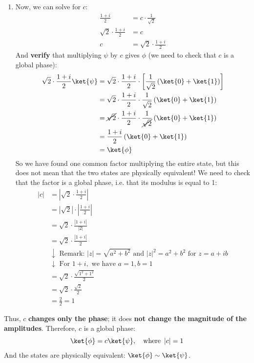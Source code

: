 \begin{enumerate}
    \item Now, we can solve for $c$:
    \begin{equation*}
        \begin{aligned}
            \frac{1+i}{2} &= c \cdot \frac{1}{\sqrt{2}} \\
            \sqrt{2} \cdot \frac{1+i}{2} &= c \\
            c &= \sqrt{2} \cdot \frac{1+i}{2}
        \end{aligned}
    \end{equation*}
    And \textbf{verify} that multiplying $\psi$ by $c$ gives $\phi$ (we need to check that $c$ is a global phase):
    \begin{align*}
        \sqrt{2} \cdot \frac{1+i}{2} \ket{\psi} &= \sqrt{2} \cdot \frac{1+i}{2} \cdot \left[\frac{1}{\sqrt{2}}\left(\ket{0} + \ket{1}\right)\right] \\
        &= \sqrt{2} \cdot \frac{1+i}{2} \cdot \frac{1}{\sqrt{2}} \left(\ket{0} + \ket{1}\right) \\
        &= \cancel{\sqrt{2}} \cdot \frac{1+i}{2} \cdot \frac{1}{\cancel{\sqrt{2}}} \left(\ket{0} + \ket{1}\right) \\
        &= \frac{1+i}{2} \left(\ket{0} + \ket{1}\right) \\
        &= \ket{\phi}
    \end{align*}
    So we have found one common factor multiplying the entire state, but this does not mean that the two states are physically equivalent! We need to check that the factor is a global phase, i.e. that its modulus is equal to 1:
    \begin{align*}
        \left|c\right| &= \left|\sqrt{2} \cdot \frac{1+i}{2}\right| \\
        &= \left|\sqrt{2}\right| \cdot \left|\frac{1+i}{2}\right| \\
        &= \sqrt{2} \cdot \frac{\left|1+i\right|}{\left|2\right|} \\
        &= \sqrt{2} \cdot \frac{\left|1+i\right|}{2} \\
        &\downarrow \text{ Remark: } \left|z\right| = \sqrt{a^2 + b^2} \text{ and } \left|z\right|^{2} = a^2 + b^2 \text{ for } z = a + ib \\
        &\downarrow \text{ For } 1+i, \text{ we have } a = 1, b = 1 \\
        &= \sqrt{2} \cdot \frac{\sqrt{1^2 + 1^2}}{2} \\
        &= \sqrt{2} \cdot \frac{\sqrt{2}}{2} \\
        &= \frac{2}{2} = 1
    \end{align*}
\end{enumerate}
Thus, $c$ \textbf{changes only the phase}; it does \textbf{not change the magnitude of the amplitudes}. Therefore, $c$ is a global phase:
\begin{equation*}
    \ket{\phi} = c \ket{\psi}, \quad \text{where } \left|c\right| = 1
\end{equation*}
And the states are physically equivalent: $\ket{\phi} \sim \ket{\psi}$.

